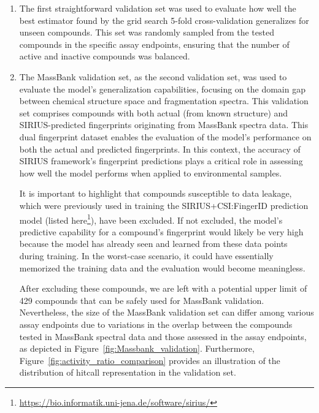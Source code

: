 \begin{enumerate}
    \item The first straightforward validation set was used to evaluate how well the best estimator found by the grid search 5-fold cross-validation generalizes for unseen compounds. This set was randomly sampled from the tested compounds in the specific assay endpoints, ensuring that the number of active and inactive compounds was balanced.
    \item The MassBank validation set, as the second validation set, was used to evaluate the model's generalization capabilities, focusing on the domain gap between chemical structure space and fragmentation spectra. This validation set comprises compounds with both actual (from known structure) and SIRIUS-predicted fingerprints originating from MassBank spectra data. This dual fingerprint dataset enables the evaluation of the model's performance on both the actual and predicted fingerprints. In this context, the accuracy of SIRIUS framework's fingerprint predictions plays a critical role in assessing how well the model performs when applied to environmental samples. 

    It is important to highlight that compounds susceptible to data leakage, which were previously used in training the SIRIUS+CSI:FingerID prediction model (listed here\footnote{\url{https://bio.informatik.uni-jena.de/software/sirius/}}), have been excluded. If not excluded, the model's predictive capability for a compound's fingerprint would likely be very high because the model has already seen and learned from these data points during training. In the worst-case scenario, it could have essentially memorized the training data and the evaluation would become meaningless.

    After excluding these compounds, we are left with a potential upper limit of 429 compounds that can be safely used for MassBank validation. Nevertheless, the size of the MassBank validation set can differ among various assay endpoints due to variations in the overlap between the compounds tested in MassBank spectral data and those assessed in the assay endpoints, as depicted in Figure~\ref{fig:Massbank_validation}. Furthermore, Figure~\ref{fig:activity_ratio_comparison} provides an illustration of the distribution of hitcall representation in the validation set.
    

\end{enumerate}
